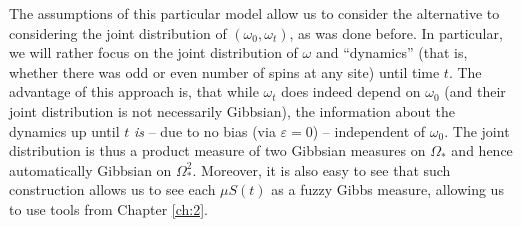 \documentclass[12pt]{article}
\newcommand{\1}{\mathbbm{1}}
\newcommand{\5}{\vspace{0.5cm}}
\theoremstyle{definition}
\begin{document}
The assumptions of this particular model allow us to consider the alternative to considering the joint distribution of $(\omega_0,\omega_t)$, as was done before. In particular, we will rather focus on the joint distribution of $\omega$ and ``dynamics'' (that is, whether there was odd or even number of spins at any site) until time $t$. The advantage of this approach is, that while $\omega_t$ does indeed depend on $\omega_0$ (and their joint distribution is not necessarily Gibbsian), the information about the dynamics up until $t$ \textit{is} -- due to no bias (via $\varepsilon=0$) -- independent of $\omega_0$. The joint distribution is thus a product measure of two Gibbsian measures on $\Omega_*$ and hence automatically Gibbsian on $\Omega_*^2$. Moreover, it is also easy to see that such construction allows us to see each $\mu S(t)$ as a fuzzy Gibbs measure, allowing us to use tools from Chapter \ref{ch:2}. \\
\end{document}
